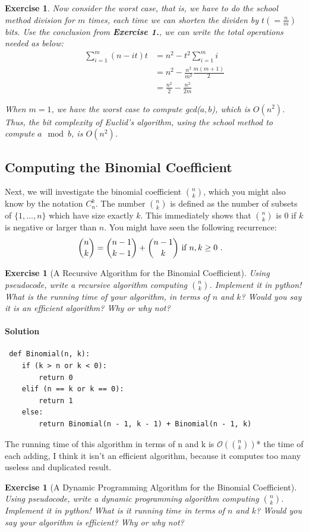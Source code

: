 \documentclass[12pt,a4]{article}
\newtheorem{exercise}[theorem]{Exercise}
\begin{document}
\begin{exercise}
Now consider the worst case, that is, we have to do the school method division for $m$ times, each time we can shorten the dividen by $t( = \frac{n}{m})$ bits.
Use the conclusion from \textbf{Exercise 1.}, we can write the total operations needed as below:
\begin{align*}
  \sum_{i=1}^m (n-it)t &= n^2 - t^2\sum_{i=1}^m i \\
  &= n^2 - \frac{n^2}{m^2} \frac{m(m+1)}{2}\\
  &= \frac{n^2}{2} - \frac{n^2}{2m}
\end{align*}

When $m = 1$, we have the worst case to compute gcd($a,b$), which is $O(n^2)$.
Thus, the bit complexity of Euclid's algorithm, using the school method
to compute $a \mod b$, is $O(n^2)$.

\end{exercise}

\subsection{Computing the Binomial Coefficient}

Next, we will investigate the binomial coefficient ${n \choose k}$, which 
you might also know by the notation $C^k_n$. The number ${n \choose k}$ is defined
as the number of subsets of $\{1,\dots,n\}$ which have size exactly $k$. 
This immediately shows that ${n \choose k}$ is $0$ if $k$ is negative or larger than $n$.
You might have seen the following recurrence:
\begin{align*}
 {n \choose k} & = {n-1 \choose k-1} + {n-1 \choose k} \textnormal{ if } n,k \geq 0 \ .
\end{align*}

\begin{exercise}[A Recursive Algorithm for the Binomial Coefficient]
  Using pseudocode, write a recursive algorithm computing
  ${n \choose k}$. Implement it in python! What is 
  the running time of your algorithm, in terms of $n$ and $k$? Would you say it is an efficient
  algorithm? Why or why not?
\end{exercise}
\paragraph{Solution}
\begin{verbatim}
 def Binomial(n, k):
    if (k > n or k < 0): 
        return 0
    elif (n == k or k == 0): 
        return 1
    else: 
        return Binomial(n - 1, k - 1) + Binomial(n - 1, k)
\end{verbatim}
The running time of this algorithm in terms of n and k is $\mathcal{O}(\binom{n}{k})$* the time of each adding, I think it isn't an efficient algorithm, because it computes too many useless and duplicated result.
\begin{exercise}[A Dynamic Programming Algorithm for the Binomial Coefficient]
  Using pseudocode, write a dynamic programming algorithm
  computing ${n \choose k}$. Implement it in python! What is it running time
  in terms of $n$ and $k$?
  Would you say your algorithm is efficient? Why or why not?
\end{exercise}
\end{document}
